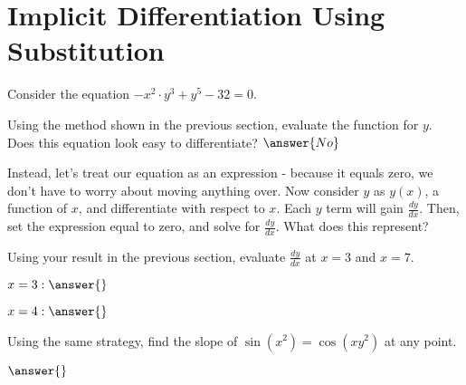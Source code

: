 \documentclass{ximera}
\begin{document}
\section{Implicit Differentiation Using Substitution}
Consider the equation $-x^2 \cdot y^3+y^5-32 = 0$.
\begin{question}
Using the method shown in the previous section, evaluate the function for $y$. Does this equation look easy to differentiate?
$\answer{No}$

Instead, let's treat our equation as an expression - because it equals zero, we don't have to worry about moving anything over. Now consider $y$ as $y(x)$, a function of $x$, and differentiate with respect to $x$. Each $y$ term will gain $\frac{dy}{dx}$. Then, set the expression equal to zero, and solve for $\frac{dy}{dx}$. What does this represent?
\begin{freeResponse}
\end{freeResponse}
\end{question}

\begin{question}
Using your result in the previous section, evaluate $\frac{dy}{dx}$ at $x = 3$ and $x = 7$.

$x = 3: \answer{}$

$x = 4: \answer{}$
\end{question}
\begin{question}
Using the same strategy, find the slope of  $\sin(x^2)=\cos(xy^2)$ at any point.

$\answer{}$
\end{question}
\end{document}

